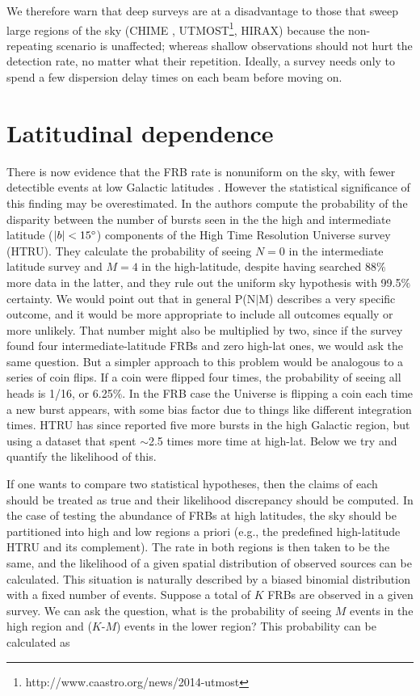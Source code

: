 \documentclass[useAMS,usenatbib]{mn2e}
\begin{document}
We therefore warn that deep surveys are at a disadvantage 
to those that sweep large regions of the sky 
(CHIME  \citep{2014SPIE.9145E..22B}, 
UTMOST\footnote{http://www.caastro.org/news/2014-utmost}, HIRAX)
because the non-repeating 
scenario is unaffected; whereas shallow observations 
should not hurt the detection rate, no matter what their repetition. 
Ideally, a survey
needs only to spend a few dispersion delay times on each beam 
before moving on. 

\section{Latitudinal dependence}
\label{latitude}
There is now evidence that the FRB rate is nonuniform on the sky, 
with fewer detectible events at low Galactic latitudes \citep{2014ira..book.....B}.
However the statistical significance of this finding may be 
overestimated. In \citep{2014ApJ...789L..26P}
the authors compute the probability of the disparity between the number of 
bursts seen in the the high and intermediate latitude ($|b| < 15\degree$)
components of the High Time Resolution Universe survey 
(HTRU). They calculate the probability of seeing $N=0$ in the intermediate 
latitude survey and $M=4$ in 
the high-latitude, despite having searched 88$\%$ more data in the latter, and they 
rule out the uniform sky hypothesis with 99.5$\%$ certainty. We would point out 
that in general P(N$|$M) describes a very specific outcome, and it would be 
more appropriate to include all outcomes equally or more unlikely.
That number might also be multiplied by two, since if the survey found 
four intermediate-latitude FRBs and zero high-lat ones, we would ask the same question. 
But a simpler approach to this problem would be analogous to a series of 
coin flips. If a coin were flipped four times, the probability of seeing all heads is 1/16, 
or 6.25$\%$. In the FRB case the Universe is flipping a coin each time a new burst 
appears, with some bias factor due to things like different integration times.
HTRU 
has since reported five more bursts in the high Galactic region, but using a dataset 
that spent $\sim$2.5 times more time at high-lat. Below we try and quantify the likelihood of 
this.


If one wants to 
compare two statistical hypotheses, then the claims of each should 
be treated as true and their likelihood discrepancy should be computed.
In the case of testing the abundance of FRBs at high latitudes,
the sky should be partitioned into high and low regions a priori 
(e.g., the predefined high-latitude HTRU and its complement). The rate in both regions 
is then taken to be the same, and the likelihood of a given spatial distribution of observed
sources can be calculated. This situation is naturally
described by a biased binomial distribution with a fixed number of events. Suppose
a total of $K$ FRBs are observed in a given survey. We can ask the question, what is the probability of 
seeing $M$ events in the high region and ($K$-$M$) events in the lower region?
This probability can be calculated %
as 
\end{document}
